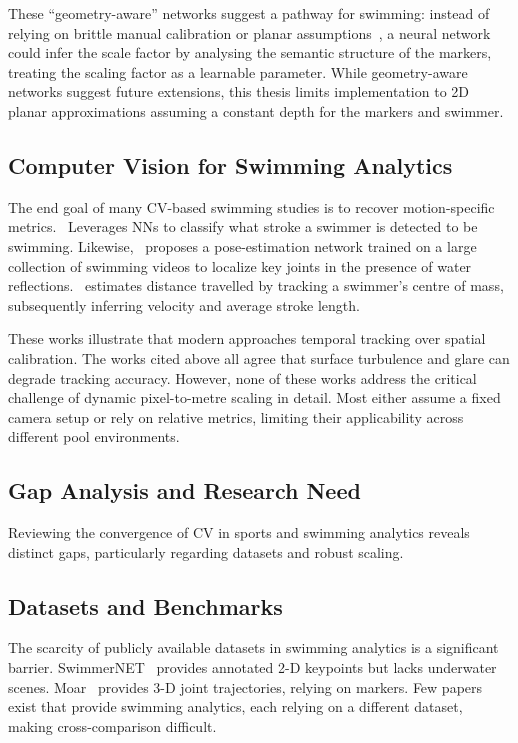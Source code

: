 \documentclass[conference]{IEEEtran}
\begin{document}
These ``geometry-aware'' networks suggest a pathway for swimming: instead of relying on brittle manual calibration or planar assumptions~\cite{zuo2021}, a neural network could infer the scale factor by analysing the semantic structure of the markers, treating the scaling factor as a learnable parameter. While geometry-aware networks suggest future extensions, this thesis limits implementation to 2D planar approximations assuming a constant depth for the markers and swimmer.

\subsection{Computer Vision for Swimming Analytics}

The end goal of many CV-based swimming studies is to recover motion-specific metrics.~\cite{almajnoni2025} Leverages NNs to classify what stroke a swimmer is detected to be swimming. Likewise,~\cite{cao2024} proposes a pose-estimation network trained on a large collection of swimming videos to localize key joints in the presence of water reflections.~\cite{tran2024} estimates distance travelled by tracking a swimmer's centre of mass, subsequently inferring velocity and average stroke length.

These works illustrate that modern approaches temporal tracking over spatial calibration. The works cited above all agree that surface turbulence and glare can degrade tracking accuracy. However, none of these works address the critical challenge of dynamic pixel-to-metre scaling in detail. Most either assume a fixed camera setup or rely on relative metrics, limiting their applicability across different pool environments.

\subsection{Gap Analysis and Research Need}

Reviewing the convergence of CV in sports and swimming analytics reveals distinct gaps, particularly regarding datasets and robust scaling.

\subsection*{Datasets and Benchmarks}
The scarcity of publicly available datasets in swimming analytics is a significant barrier. SwimmerNET~\cite{giulietti2023} provides annotated 2-D keypoints but lacks underwater scenes. Moar~\cite{almajnoni2025} provides 3-D joint trajectories, relying on markers. Few papers exist that provide swimming analytics, each relying on a different dataset, making cross-comparison difficult.
\end{document}
